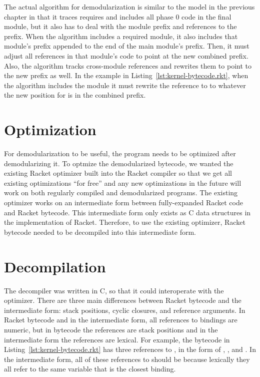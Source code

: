 The actual algorithm for demodularization is similar to the model in the previous chapter in that it traces requires and includes all phase 0 code in the final module, but it also has to deal with the module prefix and references to the prefix.
When the algorithm includes a required module, it also includes that module's prefix appended to the end of the main module's prefix. 
Then, it must adjust all references in that module's code to point at the new combined prefix.
Also, the algorithm tracks cross-module references and rewrites them to point to the new prefix as well.
In the example in Listing~\ref{lst:kernel-bytecode.rkt}, when the algorithm includes the module  it must rewrite the reference to  to whatever the new position for  is in the combined prefix.

\section{Optimization}

For demodularization to be useful, the program needs to be optimized after demodularizing it.
To optmize the demodularized bytecode, we wanted the existing Racket optimizer built into the Racket compiler so that we get all existing optimizations ``for free'' and any new optimizations in the future will work on both regularly compiled and demodularized programs.
The existing optimizer works on an intermediate form between fully-expanded Racket code and Racket bytecode.
This intermediate form only exists as C data structures in the implementation of Racket.
Therefore, to use the existing optimizer, Racket bytecode needed to be decompiled into this intermediate form. 

\section{Decompilation}

The decompiler was written in C, so that it could interoperate with the optimizer.
There are three main differences between Racket bytecode and the intermediate form: stack positions, cyclic closures, and reference arguments.
In Racket bytecode and in the intermediate form, all references to bindings are numeric, but in bytecode the references are stack positions and in the intermediate form the references are lexical.
For example, the bytecode in Listing~\ref{lst:kernel-bytecode.rkt} has three references to , in the form of , , and . 
In the intermediate form, all of these references to  should be  because lexically they all refer to the same variable that is the closest binding.

